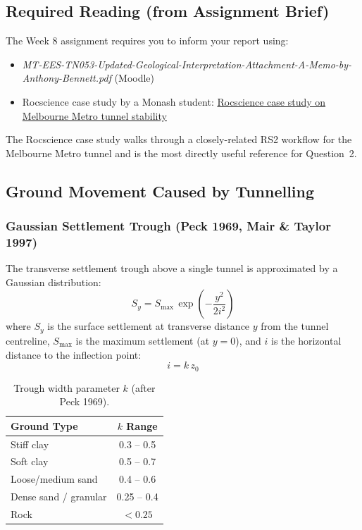 \documentclass[a4paper,12pt]{article}
\begin{document}
\subsection{Required Reading (from Assignment Brief)}
\begin{notebox}
The Week 8 assignment requires you to inform your report using:
\begin{itemize}[nosep]
    \item \textit{MT-EES-TN053-Updated-Geological-Interpretation-Attachment-A-Memo-by-Anthony-Bennett.pdf} (Moodle)
    \item Rocscience case study by a Monash student: 
    \href{https://www.rocscience.com/learning/finite-element-analysis-in-verifying-stability-of-the-melbourne-metro-tunnel}{Rocscience case study on Melbourne Metro tunnel stability}
\end{itemize}
\vspace{0.5em}

The Rocscience case study walks through a closely-related RS2 workflow for the Melbourne Metro tunnel and is the most directly useful reference for Question~2.
\end{notebox}

\subsection{Ground Movement Caused by Tunnelling}

\subsubsection{Gaussian Settlement Trough (Peck 1969, Mair \& Taylor 1997)}
The transverse settlement trough above a single tunnel is approximated by a Gaussian distribution:
\[
S_y = S_{\text{max}} \, \exp\left(-\frac{y^2}{2i^2}\right)
\]
where $S_y$ is the surface settlement at transverse distance $y$ from the tunnel centreline, $S_{\text{max}}$ is the maximum settlement (at $y=0$), and $i$ is the horizontal distance to the inflection point:
\[
i = k \, z_0
\]

\begin{table}[h!]
\centering
\begin{tabular}{lc}
\toprule
\textbf{Ground Type} & \textbf{$k$ Range} \\
\midrule
Stiff clay & 0.3 -- 0.5 \\
Soft clay & 0.5 -- 0.7 \\
Loose/medium sand & 0.4 -- 0.6 \\
Dense sand / granular & 0.25 -- 0.4 \\
Rock & $<0.25$ \\
\bottomrule
\end{tabular}
\caption{Trough width parameter $k$ (after Peck 1969).}
\label{tab:k_values}
\end{table}
\end{document}
